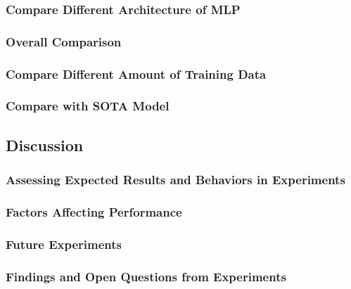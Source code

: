 \documentclass[twocolumn]{extarticle}
\begin{document}
\subsubsection{Compare Different Architecture of MLP}
\subsubsection{Overall Comparison}

\subsubsection{Compare Different Amount of Training Data}

\subsubsection{Compare with SOTA Model}

\subsection{Discussion}
\subsubsection{Assessing Expected Results and Behaviors in Experiments}
\subsubsection{Factors Affecting Performance}
\subsubsection{Future Experiments}
\subsubsection{Findings and Open Questions from Experiments}
\end{document}
